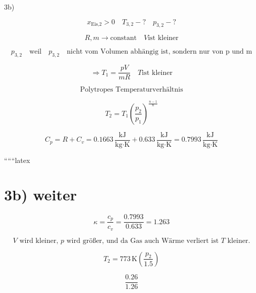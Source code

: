 3b)

\[
x_{\text{Eis,2}} > 0 \quad T_{3,2} - ? \quad p_{3,2} - ?
\]

\[
R, m \rightarrow \text{constant} \quad V \text{ist kleiner}
\]

\[
p_{3,2} \quad \text{weil} \quad p_{3,2} \quad \text{nicht vom Volumen abhängig ist, sondern nur von p und m}
\]

\[
\Rightarrow T_1 = \frac{pV}{mR} \quad T \text{ist kleiner}
\]

\[
\text{Polytropes Temperaturverhältnis}
\]

\[
T_2 = T_1 \left( \frac{p_2}{p_1} \right)^{\frac{n-1}{n}}
\]

\[
C_p = R + C_v = 0.1663 \, \frac{\text{kJ}}{\text{kg} \cdot \text{K}} + 0.633 \, \frac{\text{kJ}}{\text{kg} \cdot \text{K}} = 0.7993 \, \frac{\text{kJ}}{\text{kg} \cdot \text{K}}
\]

``````latex

\section*{3b) weiter}

\[
\kappa = \frac{c_p}{c_v} = \frac{0.7993}{0.633} = 1.263
\]

\[
V \text{ wird kleiner, } p \text{ wird größer, und da Gas auch Wärme verliert ist } T \text{ kleiner.}
\]

\[
T_2 = 773 \, \text{K} \left( \frac{p_2}{1.5} \right)
\]

\[
\frac{0.26}{1.26}
\]